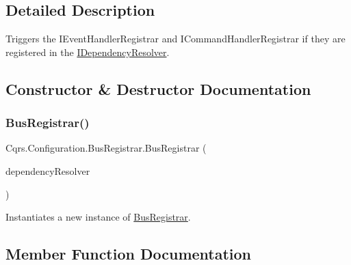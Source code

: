 \subsection{Detailed Description}
Triggers the I\+Event\+Handler\+Registrar and I\+Command\+Handler\+Registrar if they are registered in the \hyperlink{interfaceCqrs_1_1Configuration_1_1IDependencyResolver}{I\+Dependency\+Resolver}. 



\subsection{Constructor \& Destructor Documentation}
\mbox{\label{classCqrs_1_1Configuration_1_1BusRegistrar_a4a934d21a535b28af6c67154512bba20_a4a934d21a535b28af6c67154512bba20}} 
\subsubsection{\texorpdfstring{Bus\+Registrar()}{BusRegistrar()}}
{\footnotesize\ttfamily Cqrs.\+Configuration.\+Bus\+Registrar.\+Bus\+Registrar (\begin{DoxyParamCaption}\item[{\hyperlink{interfaceCqrs_1_1Configuration_1_1IDependencyResolver}{I\+Dependency\+Resolver}}]{dependency\+Resolver }\end{DoxyParamCaption})}



Instantiates a new instance of \hyperlink{classCqrs_1_1Configuration_1_1BusRegistrar}{Bus\+Registrar}. 



\subsection{Member Function Documentation}
\mbox{\label{classCqrs_1_1Configuration_1_1BusRegistrar_a07d27088739f2ae0ac7c551fc6a72ac9_a07d27088739f2ae0ac7c551fc6a72ac9}} 
